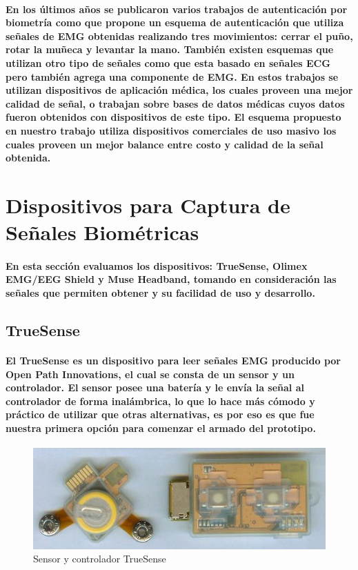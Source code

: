 \documentclass{article}
\begin{document}
\paragraph{
En los últimos años se publicaron varios trabajos de autenticación por biometría como \cite{jinsu2017} que propone un esquema de autenticación que utiliza señales de EMG obtenidas realizando tres movimientos: cerrar el puño, rotar la muñeca y levantar la mano. También existen esquemas que utilizan otro tipo de señales como \cite{nbfnf2015} que esta basado en señales ECG pero también agrega una componente de EMG. En estos trabajos se utilizan dispositivos de aplicación médica, los cuales proveen una mejor calidad de señal, o trabajan sobre bases de datos médicas cuyos datos fueron obtenidos con dispositivos de este tipo. El esquema propuesto en nuestro trabajo utiliza dispositivos comerciales de uso masivo los cuales proveen un mejor balance entre costo y calidad de la señal obtenida.
}

\section{Dispositivos para Captura de Señales Biométricas}

\paragraph{
En esta sección evaluamos los dispositivos: TrueSense, Olimex EMG/EEG Shield y Muse Headband, tomando en consideración las señales que permiten obtener y su facilidad de uso y desarrollo.
}

\subsection{TrueSense}
\paragraph{
El TrueSense es un dispositivo para leer señales EMG producido por Open Path Innovations, el cual se consta de un sensor y un controlador. El sensor posee una batería y le envía la señal al controlador de forma inalámbrica, lo que lo hace más cómodo y práctico de utilizar que otras alternativas, es por eso es que fue nuestra primera opción para comenzar el armado del prototipo.
}

\begin{figure}[ht]
    \centering
    \includegraphics[scale=1]{truesense}
    \caption{Sensor y controlador TrueSense}
    \label{fig:truesense}
\end{figure}
\end{document}
